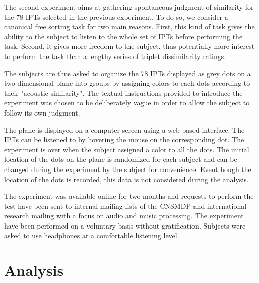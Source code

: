 \documentclass{article}
\newcommand{\ipts}{IPTs\xspace}
\begin{document}
The second experiment aims at gathering spontaneous judgment of similarity for the 78 \ipts selected in the previous experiment. To do so, we consider a canonical free sorting task for two main reasons. First, this kind of task gives the ability to the subject to listen to the whole set of \ipts before performing the task. Second, it gives more freedom to the subject, thus potentially more interest to perform the task than a lengthy series of triplet dissimilarity ratings.

The subjects are thus asked to organize the 78 \ipts displayed as grey dots on a two dimensional plane into groups by assigning colors to each dots according to their "acoustic similarity". The textual instructions provided to introduce the experiment was chosen to be deliberately vague in order to allow the subject to follow its own judgment.

The plane is displayed on a computer screen using a web based interface. The \ipts can be listened to by hovering the mouse on the corresponding dot. The experiment is over when the subject assigned a color to all the dots. The initial location of the dots on the plane is randomized for each subject and can be changed during the experiment by the subject for convenience. Event hough the location of the dots is recorded, this data is not considered during the analysis.

The experiment was available online for two months and requests to perform the test have been sent to internal mailing lists of the CNSMDP and international research mailing with a focus on audio and music processing. The experiment have been performed on a voluntary basis without gratification. Subjects were asked to use headphones at a comfortable listening level.

\section{Analysis}\label{sec:analysis}
\end{document}
